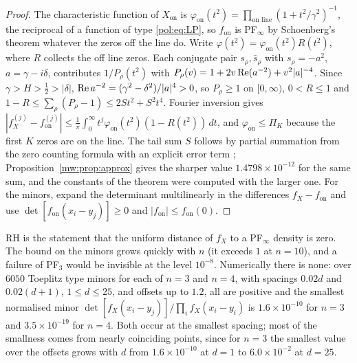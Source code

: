 \begin{proof}
The characteristic function of $X_{\mathrm{on}}$ is $\varphi_{\mathrm{on}}(t^2)=\prod_{\text{on line}}(1+t^2/\gamma^2)^{-1}$, the reciprocal of a function of type \eqref{pol:eq:LP}, so $f_{\mathrm{on}}$ is PF$_\infty$ by Schoenberg's theorem whatever the zeros off the line do. Write $\varphi(t^2)=\varphi_{\mathrm{on}}(t^2)R(t^2)$, where $R$ collects the off line zeros. Each conjugate pair $s_\rho,\bar s_\rho$ with $s_\rho=-a^2$, $a=\gamma-i\delta$, contributes $1/P_\rho(t^2)$ with $P_\rho(v)=1+2v\operatorname{Re}(a^{-2})+v^2|a|^{-4}$. Since $\gamma>H>\frac12>|\delta|$, $\operatorname{Re} a^{-2}=(\gamma^2-\delta^2)/|a|^4>0$, so $P_\rho\ge1$ on $[0,\infty)$, $0<R\le1$ and $1-R\le\sum_\rho(P_\rho-1)\le2St^2+S^2t^4$. Fourier inversion gives $|f_X^{(j)}-f_{\mathrm{on}}^{(j)}|\le\frac1\pi\int_0^\infty t^j\varphi_{\mathrm{on}}(t^2)(1-R(t^2))\,dt$, and $\varphi_{\mathrm{on}}\le\Pi_K$ because the first $K$ zeros are on the line. The tail sum $S$ follows by partial summation from the zero counting formula with an explicit error term \cite{HSW22}; Proposition~\ref{mw:prop:approx} gives the sharper value $1.4798\times10^{-12}$ for the same sum, and the constants of the theorem were computed with the larger one. For the minors, expand the determinant multilinearly in the differences $f_X-f_{\mathrm{on}}$ and use $\det[f_{\mathrm{on}}(x_i-y_j)]\ge0$ and $|f_{\mathrm{on}}|\le f_{\mathrm{on}}(0)$.
\end{proof}

RH is the statement that the uniform distance of $f_X$ to a PF$_\infty$ density is zero. The bound on the minors grows quickly with $n$ (it exceeds $1$ at $n=10$), and a failure of PF$_3$ would be invisible at the level $10^{-8}$. Numerically there is none: over $6050$ Toeplitz type minors for each of $n=3$ and $n=4$, with spacings $0.02d$ and $0.02(d+1)$, $1\le d\le25$, and offsets up to $1.2$, all are positive and the smallest normalised minor $\det[f_X(x_i-y_j)]/\prod_if_X(x_i-y_i)$ is $1.6\times10^{-10}$ for $n=3$ and $3.5\times10^{-19}$ for $n=4$. Both occur at the smallest spacing; most of the smallness comes from nearly coinciding points, since for $n=3$ the smallest value over the offsets grows with $d$ from $1.6\times10^{-10}$ at $d=1$ to $6.0\times10^{-2}$ at $d=25$.
